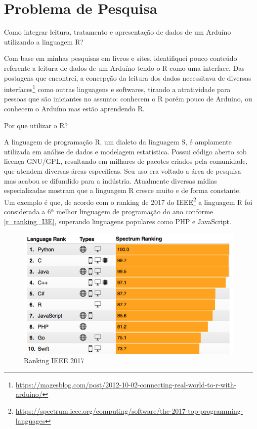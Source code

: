 \chapter[Problema de Pesquisa]{Problema de Pesquisa}

Como integrar leitura, tratamento e apresentação de dados de um Arduíno 
utilizando a linguagem R? 

Com base em minhas pesquisas em livros e sites, identifiquei 
pouco conteúdo referente a leitura de dados de um Arduíno tendo o R como uma
interface. Das postagens que encontrei, a concepção da leitura dos dados 
necessitava de diversas 
interfaces\footnote{\url{https://magesblog.com/post/2012-10-02-connecting-real-world-to-r-with-arduino/}}
como outras linguagens e softwares, tirando a atratividade para pessoas que são 
iniciantes no assunto: conhecem o R porém pouco de Arduino, ou conhecem o 
Arduíno mas estão aprendendo R.

Por que utilizar o R?

A linguagem de programação R, um dialeto da linguagem 
S, é amplamente utilizada em análise de dados e modelagem estatística. Possui 
código aberto sob licença GNU/GPL, resultando em milhares de pacotes criados 
pela comunidade, que atendem diversas áreas específicas. Seu uso era voltado 
a área de pesquisa mas acabou se difundido para a indústria. Atualmente 
diversas mídias especializadas mostram que a linguagem R cresce muito e de 
forma constante. Um exemplo é que, de acordo com o ranking de 2017 do 
IEEE\footnote{\url{https://spectrum.ieee.org/computing/software/the-2017-top-programming-languages}}
a linguagem R foi considerada a 6ª melhor linguagem de programação do ano conforme 
\autoref{r_ranking_I3E}, superando linguagens populares como PHP e 
JavaScript.

\begin{figure}[htb]
 \caption{\label{r_ranking_I3E} Ranking IEEE 2017}
 \begin{center}
  \includegraphics[scale = 0.4]{img/r_ranking_I3E.jpeg}
 \end{center}
\end{figure}

